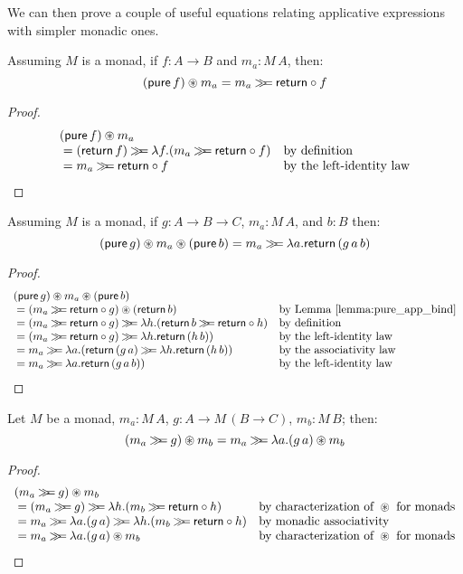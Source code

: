 We can then prove a couple of useful equations relating applicative expressions with simpler monadic ones.

\begin{lemma}\label{lemma:pure_app_bind}
Assuming $M$ is a monad, 
if $f:A\rightarrow B$ and $m_a:M\,A$, then:
$$
(\mathsf{pure}\,f)\circledast m_a = m_a \mathbin{\gg\!\!=} \mathsf{return}\circ f
$$
\end{lemma}
\begin{proof}
$$
\begin{array}{ll}
(\mathsf{pure}\,f)\circledast m_a\\
{}= (\mathsf{return}\,f) \mathbin{\gg\!\!=} \lambda f. (m_a \mathbin{\gg\!\!=} \mathsf{return}\circ f)
  & \mbox{by definition}\\
{}= m_a \mathbin{\gg\!\!=} \mathsf{return}\circ f
  & \mbox{by the left-identity law}
\end{array}
$$
\end{proof}

\begin{lemma}\label{lemma:pure_app_pure_bind}
Assuming $M$ is a monad, 
if $g:A\rightarrow B\rightarrow C$, $m_a:M\,A$, and $b:B$ then:
$$
(\mathsf{pure}\,g) \circledast m_a \circledast (\mathsf{pure}\,b) = m_a \mathbin{\gg\!\!=} \lambda a. \mathsf{return}\,(g\,a\,b)
$$
\end{lemma}
\begin{proof}
$$
\begin{array}{ll}
(\apure\,g) \appl m_a \appl (\apure\,b)\\
{}= (m_a \bind \return\comp g) \appl (\return\,b)
  & \mbox{by Lemma \ref{lemma:pure_app_bind}}\\
{}= (m_a \bind \return\comp g) \bind \lambda h. (\return\,b \bind \return \comp h)
  & \mbox{by definition}\\
{}= (m_a \bind \return\comp g) \bind \lambda h. \return\,(h\,b))
  & \mbox{by the left-identity law}\\
{}= m_a \bind \lambda a. (\return\,(g\,a) \bind \lambda h. \return\,(h\,b))
  & \mbox{by the associativity law}\\
{}= m_a \bind \lambda a. \return\,(g\,a\,b))
  & \mbox{by the left-identity law}
\end{array}
$$
\end{proof}


\begin{lemma}\label{lemma:bind_appl}
Let $M$ be a monad, $m_a:M\,A$, $g:A \rightarrow M\,(B\rightarrow C)$, $m_b:M\,B$; then:
$$
(m_a \mathbin{\gg\!\!=} g) \circledast m_b = m_a \mathbin{\gg\!\!=} \lambda a. (g\,a) \circledast m_b
$$
\end{lemma}
\begin{proof}
$$
\begin{array}{ll}
(m_a \bind g) \appl m_b \\
{}= (m_a \bind g) \bind \lambda h. (m_b \bind \return \comp h)
  & \mbox{by characterization of }\appl\mbox{ for monads}\\
{}= m_a \bind \lambda a. (g\,a) \bind \lambda h. (m_b \bind \return \comp h)
  & \mbox{by monadic associativity}\\
{}= m_a \bind \lambda a. (g\,a) \appl m_b
  & \mbox{by characterization of }\appl\mbox{ for monads}\\  
\end{array}
$$
\end{proof}


